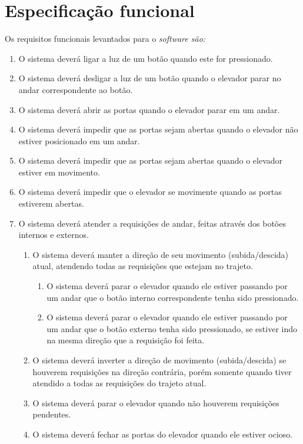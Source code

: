 \section{Especificação funcional}
\label{sec:espec_funcional}



Os requisitos funcionais levantados para o \it{software} são:

\begin{enumerate}[label=RF \arabic*. , ref=\arabic*]
	\item O sistema deverá ligar a luz de um botão quando este for pressionado.
  \item O sistema deverá desligar a luz de um botão quando o elevador parar no andar correspondente ao botão.
  \item O sistema deverá abrir as portas quando o elevador parar em um andar.
  \item O sistema deverá impedir que as portas sejam abertas quando o elevador não estiver posicionado em um andar.
  \item O sistema deverá impedir que as portas sejam abertas quando o elevador estiver em movimento.
  \item O sistema deverá impedir que o elevador se movimente quando as portas estiverem abertas.
  \item O sistema deverá atender a requisições de andar, feitas através dos botões internos e externos.
  \begin{enumerate}[label*=\arabic*.]
    \item O sistema deverá manter a direção de seu movimento (subida/descida) atual, atendendo todas as requisições que estejam no trajeto.
    \begin{enumerate}[label*=\arabic*.]
        \item O sistema deverá parar o elevador quando ele estiver passando por um andar que o botão interno correspondente tenha sido pressionado.
        \item O sistema deverá parar o elevador quando ele estiver passando por um andar que o botão externo tenha sido pressionado, se estiver indo na mesma direção que a requisição foi feita.
    \end{enumerate}
    \item O sistema deverá inverter a direção de movimento (subida/descida) se houverem requisições na direção contrária, porém somente quando tiver atendido a todas as requisições do trajeto atual.

    \item O sistema deverá parar o elevador quando não houverem requisições pendentes.
    \item O sistema deverá fechar as portas do elevador quando ele estiver ocioso.
    

\end{enumerate}
\end{enumerate}
